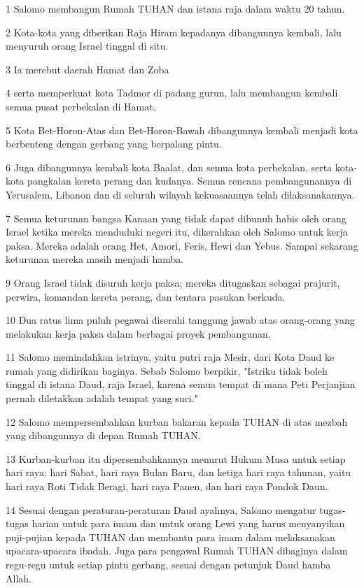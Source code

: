 \par 1 Salomo membangun Rumah TUHAN dan istana raja dalam waktu 20 tahun.
\par 2 Kota-kota yang diberikan Raja Hiram kepadanya dibangunnya kembali, lalu menyuruh orang Israel tinggal di situ.
\par 3 Ia merebut daerah Hamat dan Zoba
\par 4 serta memperkuat kota Tadmor di padang gurun, lalu membangun kembali semua pusat perbekalan di Hamat.
\par 5 Kota Bet-Horon-Atas dan Bet-Horon-Bawah dibangunnya kembali menjadi kota berbenteng dengan gerbang yang berpalang pintu.
\par 6 Juga dibangunnya kembali kota Baalat, dan semua kota perbekalan, serta kota-kota pangkalan kereta perang dan kudanya. Semua rencana pembangunannya di Yerusalem, Libanon dan di seluruh wilayah kekuasaannya telah dilaksanakannya.
\par 7 Semua keturunan bangsa Kanaan yang tidak dapat dibunuh habis oleh orang Israel ketika mereka menduduki negeri itu, dikerahkan oleh Salomo untuk kerja paksa. Mereka adalah orang Het, Amori, Feris, Hewi dan Yebus. Sampai sekarang keturunan mereka masih menjadi hamba.
\par 9 Orang Israel tidak disuruh kerja paksa; mereka ditugaskan sebagai prajurit, perwira, komandan kereta perang, dan tentara pasukan berkuda.
\par 10 Dua ratus lima puluh pegawai diserahi tanggung jawab atas orang-orang yang melakukan kerja paksa dalam berbagai proyek pembangunan.
\par 11 Salomo memindahkan istrinya, yaitu putri raja Mesir, dari Kota Daud ke rumah yang didirikan baginya. Sebab Salomo berpikir, "Istriku tidak boleh tinggal di istana Daud, raja Israel, karena semua tempat di mana Peti Perjanjian pernah diletakkan adalah tempat yang suci."
\par 12 Salomo mempersembahkan kurban bakaran kepada TUHAN di atas mezbah yang dibangunnya di depan Rumah TUHAN.
\par 13 Kurban-kurban itu dipersembahkannya menurut Hukum Musa untuk setiap hari raya: hari Sabat, hari raya Bulan Baru, dan ketiga hari raya tahunan, yaitu hari raya Roti Tidak Beragi, hari raya Panen, dan hari raya Pondok Daun.
\par 14 Sesuai dengan peraturan-peraturan Daud ayahnya, Salomo mengatur tugas-tugas harian untuk para imam dan untuk orang Lewi yang harus menyanyikan puji-pujian kepada TUHAN dan membantu para imam dalam melaksanakan upacara-upacara ibadah. Juga para pengawal Rumah TUHAN dibaginya dalam regu-regu untuk setiap pintu gerbang, sesuai dengan petunjuk Daud hamba Allah.
